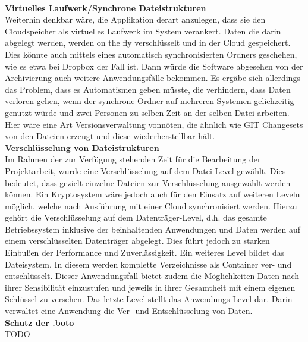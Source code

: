 \documentclass[12pt,a4paper,bibliography=totocnumbered,listof=totocnumbered]{scrartcl}
\begin{document}
\\\textbf{Virtuelles Laufwerk/Synchrone Dateistrukturen}\\
Weiterhin denkbar wäre, die Applikation derart anzulegen, dass sie den Cloudspeicher als virtuelles Laufwerk im System verankert. Daten die darin abgelegt werden, werden on the fly verschlüsselt und in der Cloud gespeichert. Dies könnte auch mittels eines automatisch synchronisierten Ordners geschehen, wie es etwa bei Dropbox der Fall ist. Dann würde die Software abgesehen von der Archivierung auch weitere Anwendungsfälle bekommen. Es ergäbe sich allerdings das Problem, dass es Automatismen geben müsste, die verhindern, dass Daten verloren gehen, wenn der synchrone Ordner auf mehreren Systemen gelichzeitig genutzt würde und zwei Personen zu selben Zeit an der selben Datei arbeiten. Hier wäre eine Art Versionsverwaltung vonnöten, die ähnlich wie GIT Changesets von den Dateien erzeugt und diese wiederherstellbar hält.
\\\textbf{Verschlüsselung von Dateistrukturen}\\
Im Rahmen der zur Verfügung stehenden Zeit für die Bearbeitung der Projektarbeit, wurde eine Verschlüsselung auf dem Datei-Level gewählt. Dies bedeutet, dass gezielt einzelne Dateien zur Verschlüsselung ausgewählt werden können. Ein Kryptosystem wäre jedoch auch für den Einsatz auf weiteren Leveln möglich, welche nach Ausführung mit einer Cloud synchronisiert werden. Hierzu gehört die Verschlüsselung auf dem Datenträger-Level, d.h. das gesamte Betriebssystem inklusive der beinhaltenden Anwendungen und Daten werden auf einem verschlüsselten Datenträger abgelegt. Dies führt jedoch zu starken Einbußen der Performance und Zuverlässigkeit. Ein weiteres Level bildet das Dateisystem. In diesem werden komplette Verzeichnisse als Container ver- und entschlüsselt. Dieser Anwendungsfall bietet zudem die Möglichkeiten Daten nach ihrer Sensibilität einzustufen und jeweils in ihrer Gesamtheit mit einem eigenen Schlüssel zu versehen. Das letzte Level stellt das Anwendungs-Level dar. Darin verwaltet eine Anwendung die Ver- und Entschlüsselung von Daten. \cite{38}
\\\textbf{Schutz der .boto}\\
TODO
\end{document}
